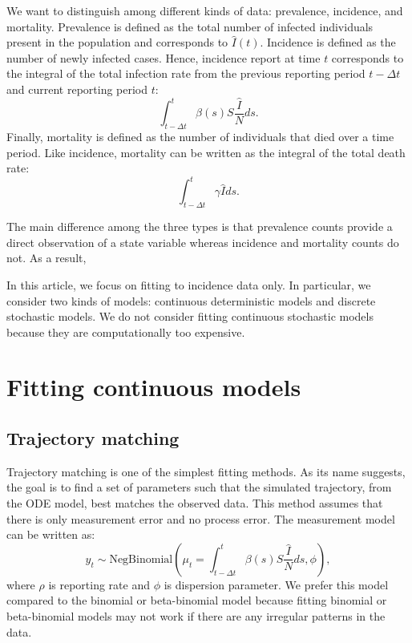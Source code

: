 \documentclass{article}
\begin{document}
We want to distinguish among different kinds of data: prevalence, incidence, and mortality.
Prevalence is defined as the total number of infected individuals present in the population and corresponds to $\hat{I}(t)$.
Incidence is defined as the number of newly infected cases. 
Hence, incidence report at time $t$ corresponds to the integral of the total infection rate from the previous reporting period $t - \Delta t$ and current reporting period $t$:
\begin{equation}
\int_{t-\Delta t}^{t} \beta(s) S \frac{\hat{I}}{N} ds.
\end{equation}
Finally, mortality is defined as the number of individuals that died over a time period.
Like incidence, mortality can be written as the integral of the total death rate:
\begin{equation}
\int_{t-\Delta t}^{t} \gamma \hat{I} ds.
\end{equation}

The main difference among the three types is that prevalence counts provide a direct observation of a state variable whereas incidence and mortality counts do not.
As a result, 

In this article, we focus on fitting to incidence data only.
In particular, we consider two kinds of models: continuous deterministic models and discrete stochastic models.
We do not consider fitting continuous stochastic models because they are computationally too expensive.

\section{Fitting continuous models}

\subsection{Trajectory matching}

Trajectory matching is one of the simplest fitting methods.
As its name suggests, the goal is to find a set of parameters such that the simulated trajectory, from the ODE model, best matches the observed data.
This method assumes that there is only measurement error and no process error.
The measurement model can be written as:
\begin{equation}
y_t \sim \mathrm{NegBinomial}\left(\mu_t= \int_{t-\Delta t}^{t} \beta(s) S \frac{\hat{I}}{N} ds, \phi \right),
\end{equation}
where $\rho$ is reporting rate and $\phi$ is dispersion parameter.
We prefer this model compared to the binomial or beta-binomial model because fitting binomial or beta-binomial models may not work if there are any irregular patterns in the data.
\end{document}
